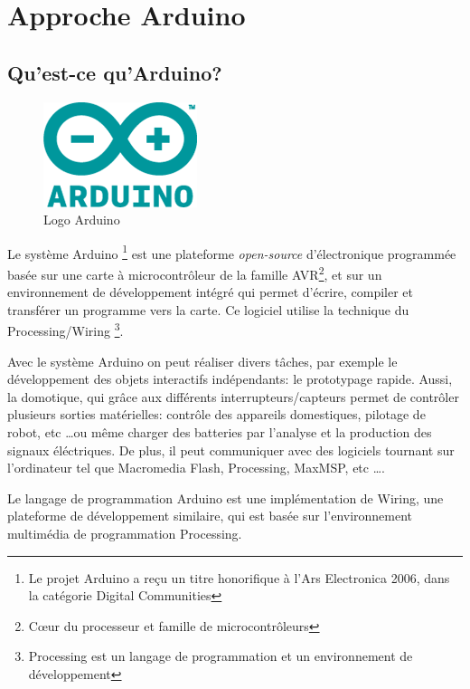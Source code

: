 \chapter[Approche Arduino]{Approche Arduino}
\label{chap:chap2}

\section{Qu'est-ce qu'Arduino?}

\begin{figure}[h]
\begin{center}
\includegraphics[scale=0.4]{figure/Arduino/Arduinologo.png}
\caption{Logo Arduino}
\end{center}
\end{figure}

Le système Arduino \footnote{Le projet Arduino a reçu un titre honorifique à l'Ars Electronica 2006, dans la catégorie Digital Communities} 
est une plateforme \textit{open-source} d'électronique programmée basée sur une carte à microcontrôleur de la famille AVR\footnote{
Cœur du processeur et famille de microcontrôleurs}, et sur un environnement
de développement intégré qui permet d'écrire, compiler et transférer un programme vers la carte. Ce logiciel utilise la technique du Processing/Wiring
\footnote{Processing est un langage de programmation et un environnement de développement}.

Avec le système Arduino on peut réaliser divers tâches, par exemple le développement des objets interactifs indépendants: le prototypage rapide. Aussi,  
la domotique, qui grâce aux différents interrupteurs/capteurs permet de contrôler plusieurs sorties matérielles: contrôle des appareils domestiques, 
pilotage de robot, etc \ldots ou même charger des batteries par l'analyse et la production des signaux éléctriques. 
De plus, il peut communiquer avec des logiciels tournant sur l'ordinateur tel que Macromedia Flash, Processing, MaxMSP, etc \ldots.

Le langage de programmation Arduino est une implémentation de Wiring, une plateforme de développement similaire, qui est basée sur l'environnement 
multimédia de programmation Processing.

